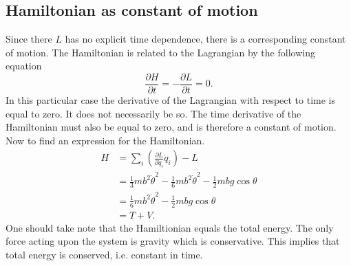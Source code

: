\documentclass[11pt]{amsart}
\begin{document}
\subsection{Hamiltonian as constant of motion}
Since there $L$ has no explicit time dependence, there is a corresponding constant of motion. The Hamiltonian is related to the Lagrangian by the following equation
\begin{equation}
\label{eq:hamlang}
\frac{\partial H}{\partial t} = -\frac{\partial L}{\partial t} = 0.
\end{equation}
In this particular case the derivative of the Lagrangian with respect to time is equal to zero. It does not necessarily be so. The time derivative of the Hamiltonian must also be equal to zero, and is therefore a constant of motion. Now to find an expression for the Hamiltonian.
\begin{align}
H &= \sum_i \left( \frac{\partial L}{\partial \dot{q}_i} \dot{q}_i\right) - L \nonumber \\
 &= \frac{1}{3}mb^2\dot{\theta}^2 - \frac{1}{6}mb^2\dot{\theta}^2 - \frac{1}{2}mbg\cos\theta \nonumber \label{eq:hamiltonian} \\
 &= \frac{1}{6}mb^2\dot{\theta}^2 - \frac{1}{2}mbg\cos\theta \\
 &= T + V. \nonumber
\end{align}
One should take note that the Hamiltionian equals the total energy. The only force acting upon the system is gravity which is conservative. This implies that total energy is conserved, i.e. constant in time.
\end{document}
